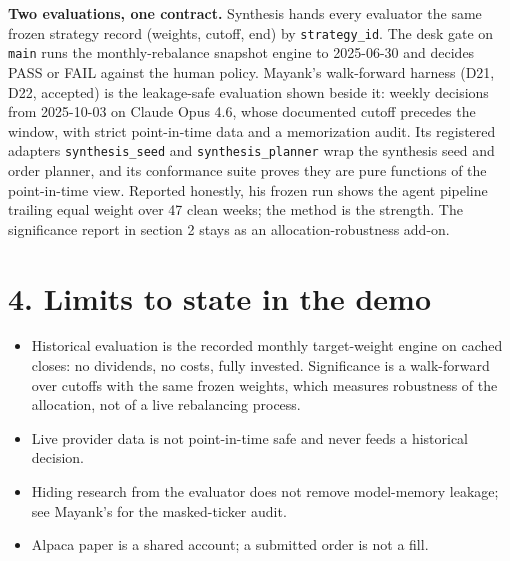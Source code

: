 \documentclass[11pt,a4paper]{article}
\begin{document}
\textbf{Two evaluations, one contract.} Synthesis hands every evaluator the same frozen strategy record (weights, cutoff, end) by \texttt{strategy\_id}. The desk gate on \texttt{main} runs the monthly-rebalance snapshot engine to 2025-06-30 and decides PASS or FAIL against the human policy. Mayank's walk-forward harness (D21, D22, accepted) is the leakage-safe evaluation shown beside it: weekly decisions from 2025-10-03 on Claude Opus 4.6, whose documented cutoff precedes the window, with strict point-in-time data and a memorization audit. Its registered adapters \texttt{synthesis\_seed} and \texttt{synthesis\_planner} wrap the synthesis seed and order planner, and its conformance suite proves they are pure functions of the point-in-time view. Reported honestly, his frozen run shows the agent pipeline trailing equal weight over 47 clean weeks; the method is the strength. The significance report in section 2 stays as an allocation-robustness add-on.

\section*{4. Limits to state in the demo}
\begin{itemize}[leftmargin=1.2em, itemsep=2pt]
  \item Historical evaluation is the recorded monthly target-weight engine on cached closes: no dividends, no costs, fully invested. Significance is a walk-forward over cutoffs with the same frozen weights, which measures robustness of the allocation, not of a live rebalancing process.
  \item Live provider data is not point-in-time safe and never feeds a historical decision.
  \item Hiding research from the evaluator does not remove model-memory leakage; see Mayank's  for the masked-ticker audit.
  \item Alpaca paper is a shared account; a submitted order is not a fill.
\end{itemize}
\end{document}
